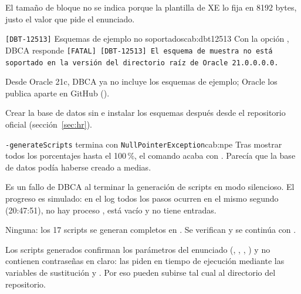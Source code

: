 El tamaño de bloque no se indica porque la plantilla de XE lo fija en 8192 bytes,
justo el valor que pide el enunciado.

\begin{cabezazo}{\texttt{[DBT-12513]} Esquemas de ejemplo no soportados}{cab:dbt12513}
\problema Con la opción , DBCA responde
\texttt{[FATAL] [DBT-12513] El esquema de muestra no está soportado en la versión
del directorio raíz de Oracle 21.0.0.0.0.}

\causa Desde Oracle 21c, DBCA ya no incluye los esquemas de ejemplo; Oracle
los publica aparte en GitHub ().

\solucion Crear la base de datos sin  e instalar los
esquemas después desde el repositorio oficial (sección~\ref{sec:hr}).
\end{cabezazo}

\begin{cabezazo}{\texttt{-generateScripts} termina con \texttt{NullPointerException}}{cab:npe}
\problema Tras mostrar todos los porcentajes hasta el 100\,\%, el comando
acaba con . Parecía que la base de
datos podía haberse creado a medias.

\causa Es un fallo de DBCA al terminar la generación de scripts en modo
silencioso. El progreso es simulado: en el log todos los pasos ocurren en el
mismo segundo (20:47:51), no hay proceso , 
está vacío y  no tiene entradas.

\solucion Ninguna: los 17 scripts se generan completos en
. Se verifican y se continúa con
.
\end{cabezazo}


Los scripts generados confirman los parámetros del enunciado
(, , ,
) y no contienen contraseñas en claro: las piden en tiempo de
ejecución mediante las variables de sustitución  y
. Por eso pueden subirse tal cual al directorio
 del repositorio.

